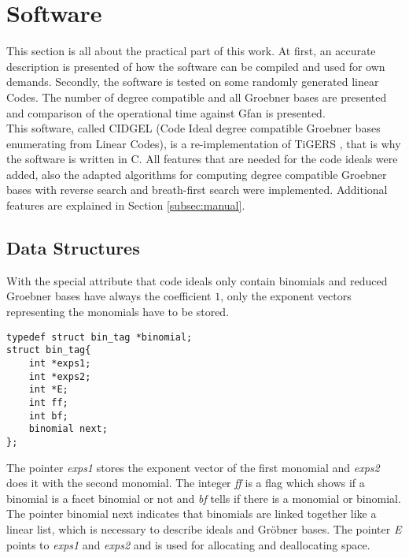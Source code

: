 \section{Software}
\label{sec:software}
This section is all about the practical part of this work. At first, an accurate description is presented of how the software can be compiled and used for own demands.
Secondly, the software is tested on some randomly generated linear Codes. The number of degree compatible and all Groebner bases are presented and comparison of the operational time against Gfan \cite{gfan} is presented. \\
This software, called CIDGEL (Code Ideal degree compatible Groebner bases enumerating from Linear Codes), is a re-implementation of TiGERS \cite{tigers}, that is why the software is written in C. All features that are needed for the code ideals were added, also the adapted algorithms for computing degree compatible Groebner bases with reverse search and breath-first search were implemented.   
Additional features are explained in Section \ref{subsec:manual}.


\subsection{Data Structures}
\label{subsec:datastructure}
With the special attribute that code ideals only contain binomials and reduced Groebner bases have always the coefficient $1$, only the exponent vectors representing the monomials have to be stored.


\begin{lstlisting} 
typedef struct bin_tag *binomial;
struct bin_tag{
    int *exps1;
    int *exps2;
    int *E;
    int ff;
    int bf;
    binomial next;
};

\end{lstlisting}
\newpage
The pointer \emph{exps1} stores the exponent vector of the first monomial and \emph{exps2} does it with the second monomial.
The integer \emph{ff} is a flag which shows if a binomial is a facet binomial or not and \emph{bf} tells if there is a monomial or binomial.
The pointer binomial next indicates that binomials are linked together like a linear list, which is necessary to describe ideals and Gröbner bases. The pointer \emph{E} points to \emph{exps1} and \emph{exps2} and is used for allocating and deallocating space. \\

